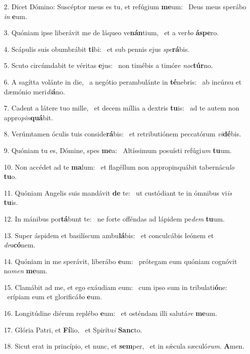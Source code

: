 2. Dicet Dómino: Suscéptor meus es tu, et refúgium \textbf{me}um: \ast\  Deus meus sperábo \textit{in} \textbf{e}um.\

3. Quóniam ipse liberávit me de láqueo ve\textbf{nán}tium, \ast\  et a ver\textit{bo} \textbf{ás}\textbf{pe}ro.\

4. Scápulis suis obumbrábit \textbf{ti}bi: \ast\  et sub pennis ejus \textit{spe}\textbf{rá}bis.\

5. Scuto circúmdabit te véritas \textbf{e}jus: \ast\  non timébis a timóre \textit{noc}\textbf{túr}no.\

6. A sagítta volánte in die, \dag\  a negótio perambulánte in \textbf{té}nebris: \ast\  ab incúrsu et dæmónio meri\textit{di}\textbf{á}no.\

7. Cadent a látere tuo mille, \dag\  et decem míllia a dextris \textbf{tu}is: \ast\  ad te autem non appro\textit{pin}\textbf{quá}bit.\

8. Verúmtamen óculis tuis conside\textbf{rá}bis: \ast\  et retributiónem peccatórum \textit{vi}\textbf{dé}bis.\

9. Quóniam tu es, Dómine, spes \textbf{me}a: \ast\  Altíssimum posuísti refúgi\textit{um} \textbf{tu}um.\

10. Non accédet ad te \textbf{ma}lum: \ast\  et flagéllum non appropinquábit tabernácu\textit{lo} \textbf{tu}o.\

11. Quóniam Angelis suis mandávit \textbf{de} te: \ast\  ut custódiant te in ómnibus vi\textit{is} \textbf{tu}is.\

12. In mánibus por\textbf{tá}bunt te: \ast\  ne forte offéndas ad lápidem pe\textit{dem} \textbf{tu}um.\

13. Super áspidem et basilíscum ambu\textbf{lá}bis: \ast\  et conculcábis leónem et \textit{dra}\textbf{có}nem.\

14. Quóniam in me sperávit, liberábo \textbf{e}um: \ast\  prótegam eum quóniam cognóvit no\textit{men} \textbf{me}um.\

15. Clamábit ad me, et ego exáudiam eum: \dag\  cum ipso sum in tribulati\textbf{ó}ne: \ast\  erípiam eum et glorificá\textit{bo} \textbf{e}um.\

16. Longitúdine diérum replébo \textbf{e}um: \ast\  et osténdam illi salutá\textit{re} \textbf{me}um.\

17. Glória Patri, et \textbf{Fí}lio, \ast\  et Spirítu\textit{i} \textbf{Sanc}to.\

18. Sicut erat in princípio, et nunc, et \textbf{sem}per, \ast\  et in sǽcula sæculó\textit{rum}. \textbf{A}men.\

